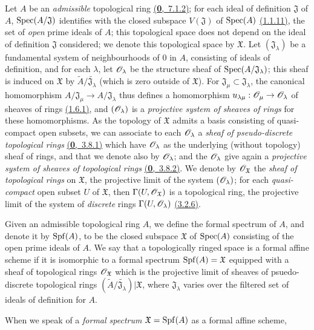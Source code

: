 \begin{env}[10.1.1]
\label{env-1.10.1.1}
Let $A$ be an {\it admissible} topological ring \hyperref[defn-0.7.1.2]{(\textbf{0},~7.1.2)}; for each
ideal of definition $\mathfrak{J}$ of $A$, ${\mathop{\mathrm{Spec}}\nolimits}(A/\mathfrak{J})$ identifies
with the closed subspace $V(\mathfrak{J})$ of ${\mathop{\mathrm{Spec}}\nolimits}(A)$ \hyperref[prop-1.1.1.11]{(1.1.11)},
the set of {\it open} prime ideals of $A$; this topological space does not depend
on the ideal of definition $\mathfrak{J}$ considered; we denote this topological
space by $\mathfrak{X}$. Let $(\mathfrak{J}_\lambda)$ be a fundamental system
of neighbourhoods of $0$ in $A$, consisting of ideals of definition, and for each
$\lambda$, let $\mathscr{O}_\lambda$ be the structure sheaf of
${\mathop{\mathrm{Spec}}\nolimits}(A/\mathfrak{J}_\lambda)$; this sheaf is induced on $\mathfrak{X}$ by
$\widetilde{A}/\widetilde{\mathfrak{J}_\lambda}$ (which is zero outside of
$\mathfrak{X}$). For $\mathfrak{J}_\mu\subset\mathfrak{J}_\lambda$, the
canonical homomorphism $A/\mathfrak{J}_\mu\to A/\mathfrak{J}_\lambda$ thus
defines a homomorphism $u_{\lambda\mu}:\mathscr{O}_\mu\to\mathscr{O}_\lambda$ of sheaves of
rings \hyperref[env-1.1.6.1]{(1.6.1)}, and $(\mathscr{O}_\lambda)$ is a {\it projective system of
sheaves of rings} for these homomorphisms. As the topology of $\mathfrak{X}$
admits a basis consisting of quasi-compact open subsets, we can associate to
each $\mathscr{O}_\lambda$ a {\it sheaf of pseudo-discrete topological rings}
\hyperref[env-0.3.8.1]{(\textbf{0},~3.8.1)} which have $\mathscr{O}_\lambda$ as the underlying (without topology) sheaf of rings, and that we denote also by $\mathscr{O}_\lambda$; and the $\mathscr{O}_\lambda$ give again a \emph{projective system of sheaves of topological rings} \hyperref[env-0.3.8.2]{(\textbf{0},~3.8.2)}.
We denote by $\mathscr{O}_\mathfrak{X}$ the {\it sheaf of topological rings} on $\mathfrak{X}$, the
projective limit of the system $(\mathscr{O}_\lambda)$; for each {\it quasi-compact} open subset $U$
of $\mathfrak{X}$, then $\Gamma(U,\mathscr{O}_\mathfrak{X})$ is a topological ring, the projective
limit of the system of {\it discrete} rings $\Gamma(U,\mathscr{O}_\lambda)$
\hyperref[env-0.3.2.6]{(3.2.6)}.
\end{env}

\begin{defn}[10.1.2]
\label{defn-1.10.1.2}
Given an admissible topological ring $A$, we define the formal spectrum of $A$, and denote
it by ${\mathop{\mathrm{Spf}}\nolimits}(A)$, to be the closed subspace $\mathfrak{X}$ of ${\mathop{\mathrm{Spec}}\nolimits}(A)$ consisting of the
open prime ideals of $A$. We say that a topologically ringed space is a formal affine scheme
if it is isomorphic to a formal spectrum ${\mathop{\mathrm{Spf}}\nolimits}(A)=\mathfrak{X}$ equipped with a sheaf of
topological rings $\mathscr{O}_\mathfrak{X}$ which is the projective limit of sheaves of
psuedo-discrete topological rings
$(\widetilde{A}/\widetilde{\mathfrak{J}_\lambda})|\mathfrak{X}$, where $\mathfrak{J}_\lambda$
varies over the filtered set of ideals of definition for $A$.
\end{defn}

When we speak of a {\it formal spectrum $\mathfrak{X}={\mathop{\mathrm{Spf}}\nolimits}(A)$} as a formal affine scheme,






